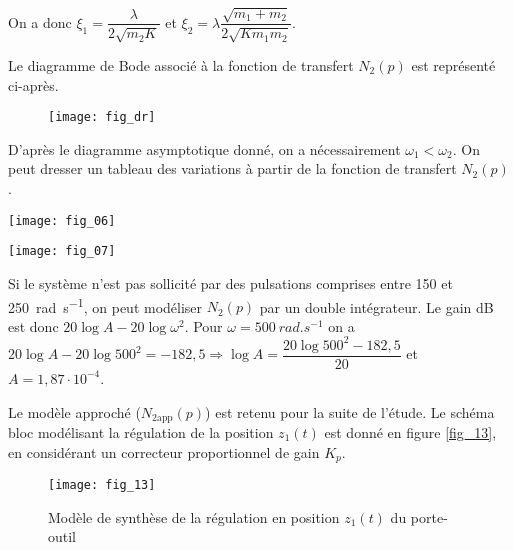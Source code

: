 \begin{multicols}{2}
\begin{corrige}
On a donc $\xi_1=\dfrac{\lambda}{2  \sqrt{m_2K}}$ et 
$\xi_2=\lambda\dfrac{\sqrt{m_1+ m_2}}{2\sqrt{Km_1m_2}}$.

\end{corrige}
\else
\fi
Le diagramme de Bode associé à la fonction de transfert $N_2(p)$ est représenté ci-après.


\begin{figure}[H]
\centering
\texttt{[image: fig\_dr]}
\end{figure}


\ifprof
\begin{corrige}
D'après le diagramme asymptotique donné, on a nécessairement $\omega_1<\omega_2$. On peut dresser un tableau des variations à partir de la fonction de transfert $N_2(p)$. 
\begin{center}
\texttt{[image: fig\_06]}

\texttt{[image: fig\_07]}
\end{center}
\end{corrige}
\else
\fi

\ifprof
\begin{corrige}
Si le système n'est pas sollicité par des pulsations comprises entre 150 et \SI{250}{rad.s^{-1}}, on peut modéliser $N_2(p)$ par un double intégrateur. 
Le gain dB est donc  $20\log A - 20 \log \omega^2$.  Pour $\omega=\SI{500}{rad.s^{-1}}$ on a $20\log A - 20 \log 500^2=-182,5 \Rightarrow \log A = \dfrac{20 \log 500^2-182,5}{20}$ et $A=1,87\cdot 10^{-4}$.
\end{corrige}
\else
\fi

Le modèle approché ($N_{2 \text{app}}(p)$) est retenu pour la suite de l’étude. Le schéma bloc modélisant la régulation de
la position $z_1(t)$ est donné en figure \autoref{fig_13}, en considérant un correcteur proportionnel de gain $K_p$.


\begin{figure}[H]
\centering
\texttt{[image: fig\_13]}
\caption{Modèle de synthèse de la régulation en position $z_1(t)$ du porte-outil \label{fig_13}}
\end{figure}



\end{multicols}
